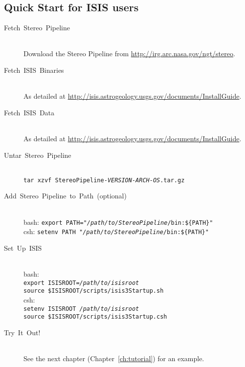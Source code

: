 \subsection{Quick Start for ISIS users}
\begin{description}

\item[{Fetch~Stereo~Pipeline}] ~\\
Download the Stereo Pipeline from \url{http://irg.arc.nasa.gov/ngt/stereo}.

\item [{Fetch~ISIS~Binaries}] ~\\
As detailed at \url{http://isis.astrogeology.usgs.gov/documents/InstallGuide}.

\item [{Fetch~ISIS~Data}] ~\\
As detailed at \url{http://isis.astrogeology.usgs.gov/documents/InstallGuide}.

\item [{Untar~Stereo~Pipeline}] ~\\
\texttt{tar xzvf StereoPipeline-\textit{VERSION-ARCH-OS}.tar.gz}

\item [{Add~Stereo~Pipeline~to~Path~(optional)}] ~\\
bash: \texttt{export PATH="\textit{/path/to/StereoPipeline}/bin:\$\{PATH\}"} \\
csh:  \texttt{setenv PATH "\textit{/path/to/StereoPipeline}/bin:\$\{PATH\}"}

\item[Set~Up~ISIS] ~\\
bash: \\
\hspace*{2em}\texttt{export ISISROOT=\textit{/path/to/isisroot}} \\
\hspace*{2em}\texttt{source \$ISISROOT/scripts/isis3Startup.sh} \\
csh: \\
\hspace*{2em}\texttt{setenv ISISROOT \textit{/path/to/isisroot}} \\
\hspace*{2em}\texttt{source \$ISISROOT/scripts/isis3Startup.csh}

\item [{Try~It~Out!}] ~\\
See the next chapter (Chapter~\ref{ch:tutorial}) for an example.
\end{description}

